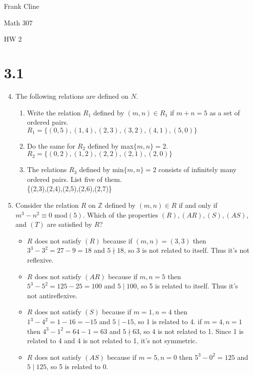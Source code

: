 \documentclass{article}
\newcommand{\Z}{\mathbb{Z}}
\begin{document}
\onehalfspacing
\hfill Frank Cline

\hfill Math 307

\hfill HW 2


\section*{3.1}

\begin{enumerate}
\setcounter{enumi}{3}
\item The following relations are defined on $N$.
	\begin{enumerate}
	\item Write the relation $R_1$ defined by $(m,n)\in R_1$ if $m+n=5$ as a set of ordered pairs.\\
	$R_1=\{(0,5),(1,4),(2,3),(3,2),(4,1),(5,0)\}$
	\item Do the same for $R_2$ defined by max$\{m,n\}=2$.\\
	$R_2=\{(0,2),(1,2),(2,2),(2,1),(2,0)\}$
	\item The relations $R_3$ defined by min$\{m,n\}=2$ consists of infinitely many ordered pairs. List five 	of them.\\
	\{(2,3),(2,4),(2,5),(2,6),(2,7)\}
	\end{enumerate}
\setcounter{enumi}{5}
\item Consider the relation $R$ on $\Z$ defined by $(m,n)\in R$ if and only if $m^3-n^2\equiv 0$ mod$(5)$. Which of the properties $(R),(AR),(S),(AS)$, and $(T)$ are satisfied by $R$?
	\begin{itemize}
	\item $R$ does not satisfy $(R)$ because if $(m,n)=(3,3)$ then $3^3-3^2=27-9=18$ and $5\nmid18$, so 3 is not related to 			itself. Thus it's not reflexive.
	\item $R$ does not satisfy $(AR)$ because if $m,n=5$ then $5^3-5^2=125-25=100$ and $5\mid100$, so 5 is related to 
	itself. Thus it's not antireflexive.
	\item $R$ does not satisfy $(S)$ because if $m=1,n=4$ then $1^3-4^2=1-16=-15$ and $5\mid-15$, so 1 is related to 4.
	if $m=4,n=1$ then $4^3-1^2=64-1=63$ and $5\nmid63$, so 4 is not related to 1. Since 1 is related to 4 
	and 4 is not related to 1, it's not symmetric.
	\item $R$ does not satisfy $(AS)$ because if $m=5,n=0$ then $5^3-0^2=125$ and $5\mid125$, so 5 is related to 0.

\end{itemize}
\end{enumerate}
\end{document}
